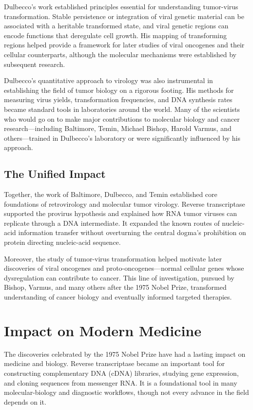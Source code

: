Dulbecco's work established principles essential for understanding tumor-virus transformation. Stable persistence or integration of viral genetic material can be associated with a heritable transformed state, and viral genetic regions can encode functions that deregulate cell growth. His mapping of transforming regions helped provide a framework for later studies of viral oncogenes and their cellular counterparts, although the molecular mechanisms were established by subsequent research.

Dulbecco's quantitative approach to virology was also instrumental in establishing the field of tumor biology on a rigorous footing. His methods for measuring virus yields, transformation frequencies, and DNA synthesis rates became standard tools in laboratories around the world. Many of the scientists who would go on to make major contributions to molecular biology and cancer research---including Baltimore, Temin, Michael Bishop, Harold Varmus, and others---trained in Dulbecco's laboratory or were significantly influenced by his approach.

\subsection{The Unified Impact}

Together, the work of Baltimore, Dulbecco, and Temin established core foundations of retrovirology and molecular tumor virology. Reverse transcriptase supported the provirus hypothesis and explained how RNA tumor viruses can replicate through a DNA intermediate. It expanded the known routes of nucleic-acid information transfer without overturning the central dogma's prohibition on protein directing nucleic-acid sequence.

Moreover, the study of tumor-virus transformation helped motivate later discoveries of viral oncogenes and proto-oncogenes---normal cellular genes whose dysregulation can contribute to cancer. This line of investigation, pursued by Bishop, Varmus, and many others after the 1975 Nobel Prize, transformed understanding of cancer biology and eventually informed targeted therapies.

\section{Impact on Modern Medicine}

The discoveries celebrated by the 1975 Nobel Prize have had a lasting impact on medicine and biology. Reverse transcriptase became an important tool for constructing complementary DNA (cDNA) libraries, studying gene expression, and cloning sequences from messenger RNA. It is a foundational tool in many molecular-biology and diagnostic workflows, though not every advance in the field depends on it.

